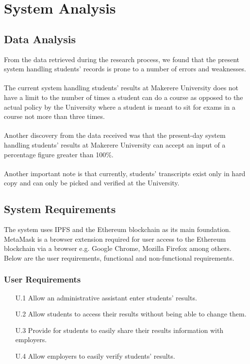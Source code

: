 \newpage
\section{System Analysis}
\subsection{Data Analysis}
From the data retrieved during the research process, we found that the present system handling students’ records is prone to a number of errors and weaknesses.\\\\
The current system handling students’ results at Makerere University does not have a limit to the number of times a student can do a course as opposed to the actual policy by the University where a student is meant to sit for exams in a course not more than three times.\\\\
Another discovery from the data received was that the present-day system handling students’ results at Makerere University can accept an input of a percentage figure greater than 100\%.\\\\
Another important note is that currently, students' transcripts exist only in hard copy and can only be picked and verified at the University.

\subsection{System Requirements}
The system uses IPFS and the Ethereum blockchain as its main foundation. MetaMask is a browser extension required for user access to the Ethereum blockchain  via a browser e.g. Google Chrome, Mozilla Firefox among others. Below are the user requirements, functional and non-functional requirements.

\subsubsection{User Requirements}
\begin{enumerate}
\item[U.1] Allow an administrative assistant enter students’ results.
\item[U.2] Allow students to access their results without being able to change them.
\item[U.3] Provide for students to easily share their results information with employers.
\item[U.4] Allow employers to easily verify students' results.
\end{enumerate}

